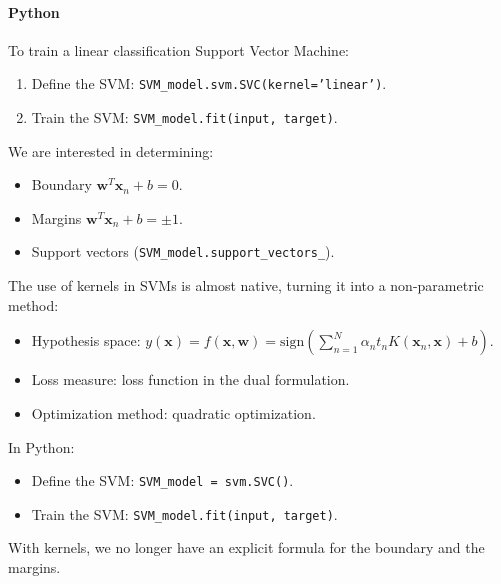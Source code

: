 \paragraph*{Python}
To train a linear classification Support Vector Machine: 
\begin{enumerate}
    \item Define the SVM: \texttt{SVM\_model.svm.SVC(kernel='linear')}.
    \item Train the SVM: \texttt{SVM\_model.fit(input, target)}.
\end{enumerate}
We are interested in determining:
\begin{itemize}
    \item Boundary $\textbf{w}^T\textbf{x}_n+b=0$.
    \item Margins $\textbf{w}^T\textbf{x}_n+b=\pm 1$.
    \item Support vectors (\texttt{SVM\_model.support\_vectors\_}).
\end{itemize}
The use of kernels in SVMs is almost native, turning it into a non-parametric method:
\begin{itemize}
    \item Hypothesis space: $y(\mathbf{x})=f(\mathbf{x},\mathbf{w})=\text{sign}\left(\sum_{n=1}^{N}\alpha_nt_nK(\mathbf{x}_n,\mathbf{x})+b\right)$. 
    \item Loss measure: loss function in the dual formulation.
    \item Optimization method: quadratic optimization.
\end{itemize}
In Python:
\begin{itemize}
    \item Define the SVM: \texttt{SVM\_model = svm.SVC()}.
    \item Train the SVM: \texttt{SVM\_model.fit(input, target)}.
\end{itemize}
With kernels, we no longer have an explicit formula for the boundary and the margins.